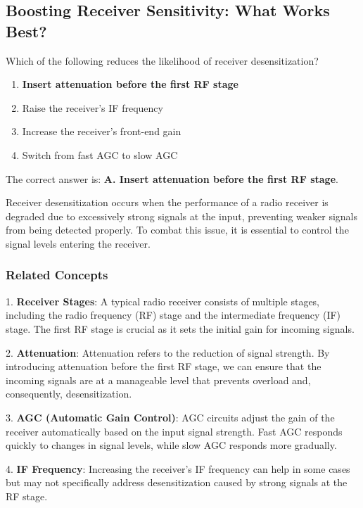 \subsection*{Boosting Receiver Sensitivity: What Works Best?}

\begin{tcolorbox}[colback=gray!10, colframe=black, title=E4D07`]
Which of the following reduces the likelihood of receiver desensitization? 
\begin{enumerate}[label=\Alph*.]
    \item \textbf{Insert attenuation before the first RF stage}
    \item Raise the receiver’s IF frequency
    \item Increase the receiver’s front-end gain
    \item Switch from fast AGC to slow AGC
\end{enumerate} \end{tcolorbox}

The correct answer is: \textbf{A. Insert attenuation before the first RF stage}.

Receiver desensitization occurs when the performance of a radio receiver is degraded due to excessively strong signals at the input, preventing weaker signals from being detected properly. To combat this issue, it is essential to control the signal levels entering the receiver.

\subsubsection*{ Related Concepts}

1. \textbf{Receiver Stages}: A typical radio receiver consists of multiple stages, including the radio frequency (RF) stage and the intermediate frequency (IF) stage. The first RF stage is crucial as it sets the initial gain for incoming signals.

2. \textbf{Attenuation}: Attenuation refers to the reduction of signal strength. By introducing attenuation before the first RF stage, we can ensure that the incoming signals are at a manageable level that prevents overload and, consequently, desensitization.

3. \textbf{AGC (Automatic Gain Control)}: AGC circuits adjust the gain of the receiver automatically based on the input signal strength. Fast AGC responds quickly to changes in signal levels, while slow AGC responds more gradually.

4. \textbf{IF Frequency}: Increasing the receiver's IF frequency can help in some cases but may not specifically address desensitization caused by strong signals at the RF stage.

